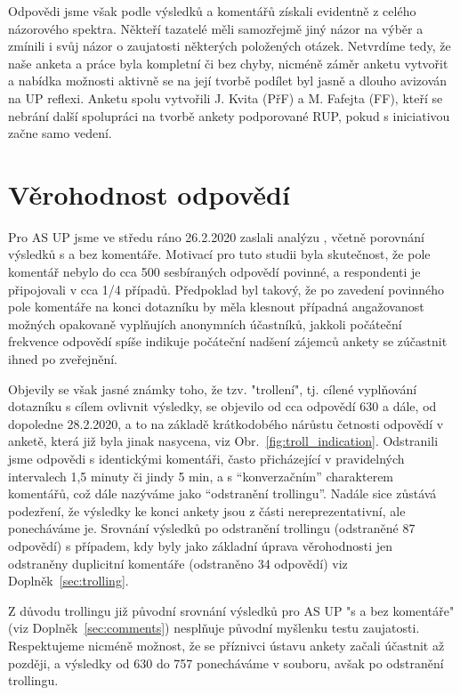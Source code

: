 \documentclass[a4paper,twoside]{article}
\begin{document}
Odpovědi jsme však podle výsledků a komentářů získali evidentně z celého názorového spektra. Někteří tazatelé měli samozřejmě jiný názor na výběr a zmínili i svůj názor o zaujatosti některých položených otázek. Netvrdíme tedy, že naše anketa a práce byla kompletní či bez chyby, nicméně záměr anketu vytvořit a nabídka možnosti aktivně se na její tvorbě podílet byl jasně a dlouho avizován na UP reflexi. Anketu spolu vytvořili J. Kvita (PřF) a M. Fafejta (FF), kteří se nebrání další spolupráci na tvorbě ankety podporované RUP, pokud s iniciativou začne samo vedení.


\section{Věrohodnost odpovědí}
\label{sec:Sel}
Pro AS UP jsme ve středu ráno 26.2.2020 zaslali analýzu , včetně porovnání výsledků s a bez komentáře.
Motivací pro tuto studii byla skutečnost, že pole komentář nebylo do cca 500 sesbíraných odpovědí povinné, a respondenti je připojovali v cca 1/4 případů. Předpoklad byl takový, že po zavedení povinného pole komentáře na konci dotazníku by měla klesnout případná angažovanost možných opakovaně vyplňujích anonymních účastníků, jakkoli počáteční frekvence odpovědí spíše indikuje počáteční nadšení zájemců ankety se zúčastnit ihned po zveřejnění. 

Objevily se však jasné známky toho, že tzv. "trollení", tj. cílené vyplňování dotazníku s cílem ovlivnit výsledky, se objevilo od cca odpovědí 630 a dále, od dopoledne 28.2.2020, a to na základě krátkodobého nárůstu četnosti odpovědí v anketě, která již byla jinak nasycena, viz Obr.~\ref{fig:troll_indication}. Odstranili jsme odpovědi s identickými komentáři, často přicházející v pravidelných intervalech 1,5 minuty či jindy 5 min, a s ``konverzačním'' charakterem komentářů, což dále nazýváme jako ``odstranění trollingu''. Nadále sice zůstává podezření, že výsledky ke konci ankety jsou z části nereprezentativní, ale ponecháváme je. Srovnání výsledků po odstranění trollingu (odstraněné 87 odpovědí) s případem, kdy byly jako základní úprava věrohodnosti jen odstraněny duplicitní komentáře (odstraněno 34 odpovědí) viz Doplněk~\ref{sec:trolling}.

Z důvodu trollingu již původní srovnání výsledků pro AS UP "s a bez komentáře" (viz Doplněk~\ref{sec:comments}) nesplňuje původní myšlenku testu zaujatosti. Respektujeme nicméně možnost, že se příznivci ústavu ankety začali účastnit až později, a výsledky od 630 do 757 ponecháváme v souboru, avšak po odstranění trollingu. 
\end{document}
